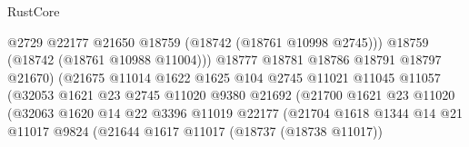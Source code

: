 \begin{lexlean}{RustCore}
\begin{coremodule}
                                            @2729
                                            @22177
                                            @21650
                                            @18759
                                            (@18742 (@18761 @10998 @2745)))
                                          @18759
                                          (@18742 (@18761 @10988 @11004)))
                                        @18777
                                        @18781
                                        @18786
                                        @18791
                                        @18797
                                        @21670)
                                      (@21675
                                        @11014
                                        @1622
                                        @1625
                                        @104
                                        @2745
                                        @11021
                                        @11045
                                        @11057
                                        (@32053
                                          @1621
                                          @23
                                          @2745
                                          @11020
                                          @9380
                                          @21692
                                          (@21700
                                            @1621
                                            @23
                                            @11020
                                            (@32063
                                              @1620
                                              @14
                                              @22
                                              @3396
                                              @11019
                                              @22177
                                              (@21704
                                                @1618
                                                @1344
                                                @14
                                                @21
                                                @11017
                                                @9824
                                                (@21644
                                                  @1617
                                                  @11017
                                                  (@18737 (@18738 @11017))

\end{coremodule}
\end{lexlean}
